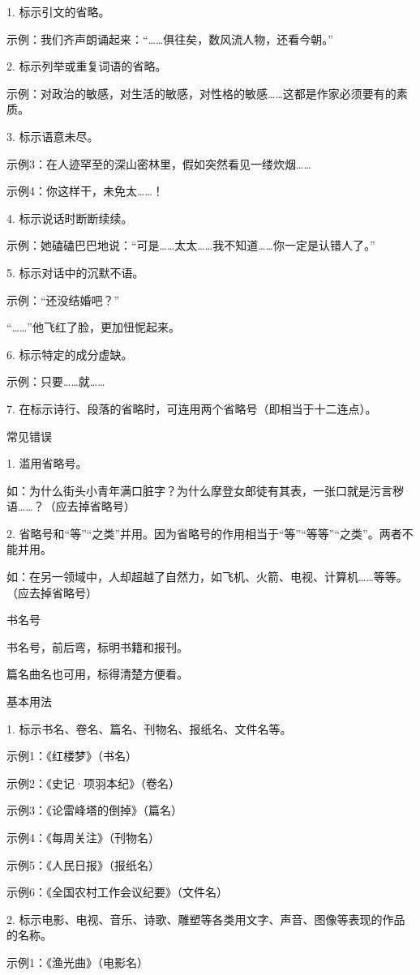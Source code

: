 1. 标示引文的省略。

示例：我们齐声朗诵起来：“……俱往矣，数风流人物，还看今朝。”

2. 标示列举或重复词语的省略。

示例：对政治的敏感，对生活的敏感，对性格的敏感……这都是作家必须要有的素质。

3. 标示语意未尽。

示例3：在人迹罕至的深山密林里，假如突然看见一缕炊烟……

示例4：你这样干，未免太……！

4. 标示说话时断断续续。

示例：她磕磕巴巴地说：“可是……太太……我不知道……你一定是认错人了。”

5. 标示对话中的沉默不语。

示例：“还没结婚吧？”

“……”他飞红了脸，更加忸怩起来。

6. 标示特定的成分虚缺。

示例：只要……就……

7. 在标示诗行、段落的省略时，可连用两个省略号（即相当于十二连点）。

常见错误

1. 滥用省略号。

如：为什么街头小青年满口脏字？为什么摩登女郎徒有其表，一张口就是污言秽语……？（应去掉省略号）

2. 省略号和“等”“之类”并用。因为省略号的作用相当于“等”“等等”“之类”。两者不能并用。

如：在另一领域中，人却超越了自然力，如飞机、火箭、电视、计算机……等等。（应去掉省略号）

书名号

书名号，前后弯，标明书籍和报刊。

篇名曲名也可用，标得清楚方便看。

基本用法

1. 标示书名、卷名、篇名、刊物名、报纸名、文件名等。

示例1：《红楼梦》（书名）

示例2：《史记·项羽本纪》（卷名）

示例3：《论雷峰塔的倒掉》（篇名）

示例4：《每周关注》（刊物名）

示例5：《人民日报》（报纸名）

示例6：《全国农村工作会议纪要》（文件名）

2. 标示电影、电视、音乐、诗歌、雕塑等各类用文字、声音、图像等表现的作品的名称。

示例1：《渔光曲》（电影名）

